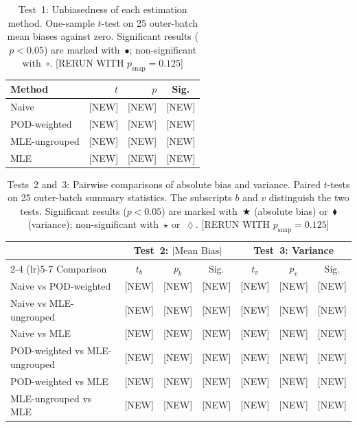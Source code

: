 \documentclass[11pt]{article}
\newcommand{\edit}[1]{{\color{magenta}#1}}
\begin{document}
\begin{table}[htbp]
\centering
\caption{Test~1: Unbiasedness of each estimation method. One-sample $t$-test on 25 outer-batch mean biases against zero. Significant results ($p < 0.05$) are marked with~$\bullet$; non-significant with~$\circ$. \edit{[RERUN WITH $p_{\text{snap}}=0.125$]}}
\label{tab:unbiasedness}
\small
\vspace{6pt}
\begin{tabular}{l r r c}
\toprule
Method & $t$ & $p$ & Sig. \\
\midrule
Naive          & \edit{[NEW]} & \edit{[NEW]} & \edit{[NEW]} \\
POD-weighted   & \edit{[NEW]} & \edit{[NEW]} & \edit{[NEW]} \\
MLE-ungrouped  & \edit{[NEW]} & \edit{[NEW]} & \edit{[NEW]} \\
MLE            & \edit{[NEW]} & \edit{[NEW]} & \edit{[NEW]} \\
\bottomrule
\end{tabular}
\end{table}

\begin{table}[htbp]
\centering
\caption{Tests~2 and~3: Pairwise comparisons of absolute bias and variance. Paired $t$-tests on 25 outer-batch summary statistics. The subscripts $b$ and $v$ distinguish the two tests. Significant results ($p < 0.05$) are marked with~$\bigstar$ (absolute bias) or~$\blacklozenge$ (variance); non-significant with~$\star$ or~$\lozenge$. \edit{[RERUN WITH $p_{\text{snap}}=0.125$]}}
\label{tab:pairwise_tests}
\small
\vspace{6pt}
\begin{tabular}{l cc c cc c}
\toprule
 & \multicolumn{3}{c}{Test~2: $|\text{Mean Bias}|$} & \multicolumn{3}{c}{Test~3: Variance} \\
\cmidrule(lr){2-4} \cmidrule(lr){5-7}
Comparison & $t_b$ & $p_b$ & Sig. & $t_v$ & $p_v$ & Sig. \\
\midrule
Naive vs POD-weighted         & \edit{[NEW]} & \edit{[NEW]} & \edit{[NEW]} & \edit{[NEW]} & \edit{[NEW]} & \edit{[NEW]} \\
Naive vs MLE-ungrouped        & \edit{[NEW]} & \edit{[NEW]} & \edit{[NEW]} & \edit{[NEW]} & \edit{[NEW]} & \edit{[NEW]} \\
Naive vs MLE                  & \edit{[NEW]} & \edit{[NEW]} & \edit{[NEW]} & \edit{[NEW]} & \edit{[NEW]} & \edit{[NEW]} \\
POD-weighted vs MLE-ungrouped & \edit{[NEW]} & \edit{[NEW]} & \edit{[NEW]} & \edit{[NEW]} & \edit{[NEW]} & \edit{[NEW]} \\
POD-weighted vs MLE           & \edit{[NEW]} & \edit{[NEW]} & \edit{[NEW]} & \edit{[NEW]} & \edit{[NEW]} & \edit{[NEW]} \\
MLE-ungrouped vs MLE          & \edit{[NEW]} & \edit{[NEW]} & \edit{[NEW]} & \edit{[NEW]} & \edit{[NEW]} & \edit{[NEW]} \\
\bottomrule
\end{tabular}
\end{table}
\end{document}
